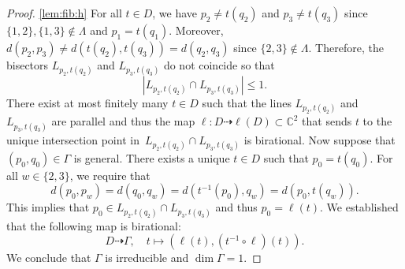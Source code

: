 \documentclass[10pt,a4paper]{amsart}
\newcommand{\C}{{\mathbb{C}}}
\newcommand{\dto}{\dasharrow}
\newcommand{\sd}{d} %
\newcommand{\st}{such that }
\renewcommand{\c}{\colon}
\begin{document}
\begin{proof}
\ref{lem:fib:h}
For all $t\in D$, we have $p_2\neq t(q_2)$ and $p_3\neq t(q_3)$
since $\{1,2\},\{1,3\}\notin \Lambda$ and $p_1=t(q_1)$.
Moreover, $\sd(p_2,p_3)\neq\sd(t(q_2),t(q_3))=\sd(q_2,q_3)$ since $\{2,3\}\notin\Lambda$.
Therefore, the bisectors $L_{p_2,t(q_2)}$ and $L_{p_3,t(q_3)}$ do not coincide so that
\[
|L_{p_2,t(q_2)}\cap L_{p_3,t(q_3)}|\leq 1.
\]
There exist at most finitely many $t\in D$ such that the
lines $L_{p_2,t(q_2)}$ and $L_{p_3,t(q_3)}$
are parallel and thus the map $\ell\c D\dto \ell(D)\subset\C^2$
that sends $t$ to the unique intersection point in~$L_{p_2,t(q_2)}\cap L_{p_3,t(q_3)}$
is birational.
Now suppose that $(p_0,q_0)\in\Gamma$ is general.
There exists a unique $t\in D$ \st $p_0=t(q_0)$.
For all $w\in\{2,3\}$, we require that
\[
\sd(p_0,p_w)=\sd(q_0,q_w)=\sd(t^{-1}(p_0),q_w)=\sd(p_0,t(q_w)).
\]
This implies that $p_0\in L_{p_2,t(q_2)}\cap L_{p_3,t(q_3)}$ and thus $p_0=\ell(t)$.
We established that the following map is birational:
\[
D\dto \Gamma,\quad t\mapsto (\ell(t),(t^{-1}\circ\ell)(t)).
\]
We conclude that $\Gamma$ is irreducible and $\dim\Gamma=1$.
\end{proof}
\end{document}
